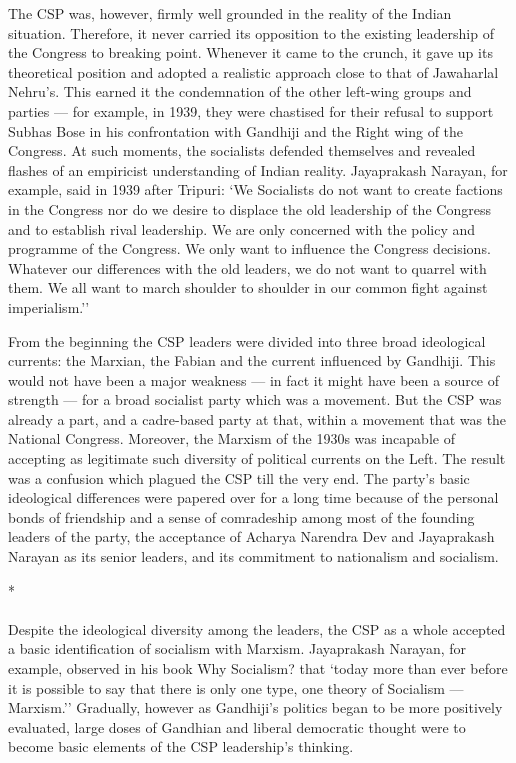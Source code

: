 The CSP was, however, firmly well grounded in the reality of the Indian situation. Therefore, it never carried its opposition to the existing leadership of the Congress to breaking point. Whenever it came to the crunch, it gave up its theoretical position and adopted a realistic approach close to that of Jawaharlal Nehru's. This earned it the condemnation of the other left-wing groups and parties — for example, in 1939, they were chastised for their refusal to support Subhas Bose in his confrontation with Gandhiji and the Right wing of the Congress. At such moments, the socialists defended themselves and revealed flashes of an empiricist understanding of Indian reality. Jayaprakash Narayan, for example, said in 1939 after Tripuri: `We Socialists do not want to create factions in the Congress nor do we desire to displace the old leadership of the Congress and to establish rival leadership. We are only concerned with the policy and programme of the Congress. We only want to influence the Congress decisions. Whatever our differences with the old leaders, we do not want to quarrel with them. We all want to march shoulder to shoulder in our common fight against imperialism.'' 

From the beginning the CSP leaders were divided into three broad ideological currents: the Marxian, the Fabian and the current influenced by Gandhiji. This would not have been a major weakness — in fact it might have been a source of strength — for a broad socialist party which was a movement. But the CSP was already a part, and a cadre-based party at that, within a movement that was the National Congress. Moreover, the Marxism of the 1930s was incapable of accepting as legitimate such diversity of political currents on the Left. The result was a confusion which plagued the CSP till the very end. The party's basic ideological differences were papered over for a long time because of the personal bonds of friendship and a sense of comradeship among most of the founding leaders of the party, the acceptance of Acharya Narendra Dev and Jayaprakash Narayan as its senior leaders, and its commitment to nationalism and socialism.

\begin{center}*\end{center}

\paragraph*{}


Despite the ideological diversity among the leaders, the CSP as a whole accepted a basic identification of socialism with Marxism. Jayaprakash Narayan, for example, observed in his book Why Socialism? that `today more than ever before it is possible to say that there is only one type, one theory of Socialism — Marxism.'' Gradually, however as Gandhiji's politics began to be more positively evaluated, large doses of Gandhian and liberal democratic thought were to become basic elements of the CSP leadership's thinking. 

